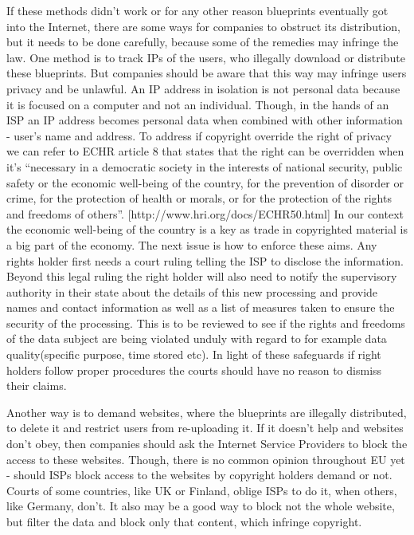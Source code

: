 If these methods didn’t work or for any other reason blueprints eventually got into the Internet, there are some ways for companies to obstruct its distribution, but it needs to be done carefully, because some of the remedies may infringe the law.
One method is to track IPs of the users, who illegally download or distribute these blueprints.
But companies should be aware that this way may infringe users privacy and be unlawful.
An IP address in isolation is not personal data because it is focused on a computer and not an individual.
Though, in the hands of an ISP an IP address becomes personal data when combined with other information - user’s name and address.
To address if copyright override the right of privacy we can refer to ECHR article 8 that states that the right can be overridden when it’s “necessary in a democratic society in the interests of national security, public safety or the economic well-being of the country, for the prevention of disorder or crime, for the protection of health or morals, or for the protection of the rights and freedoms of others”.
[http://www.hri.org/docs/ECHR50.html] In our context the economic well-being of the country is a key as trade in copyrighted material is a big part of the economy.
The next issue is how to enforce these aims.
Any rights holder first needs a court ruling telling the ISP to disclose the information.
Beyond this legal ruling the right holder will also need to notify the supervisory authority in their state about the details of this new processing and provide names and contact information as well as a list of measures taken to ensure the security of the processing.
This is to be reviewed to see if the rights and freedoms of the data subject are being violated unduly with regard to for example data quality(specific purpose, time stored etc).
In light of these safeguards if right holders follow proper procedures the courts should have no reason to dismiss their claims.

Another way is to demand websites, where the blueprints are illegally distributed, to delete it and restrict users from re-uploading it.
If it doesn’t help and websites don’t obey, then companies should ask the Internet Service Providers to block the access to these websites.
Though, there is no common opinion throughout EU yet - should ISPs block access to the websites by copyright holders demand or not.
Courts of some countries, like UK or Finland, oblige ISPs to do it, when others, like Germany, don’t.
It also may be a good way to block not the whole website, but filter the data and block only that content, which infringe copyright.

